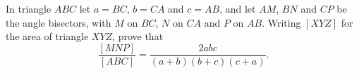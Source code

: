 In triangle $ABC$ let $a=BC$, $b=CA$ and $c=AB$, and let $AM$, $BN$ and $CP$ be the angle bisectors, with $M$ on $BC$, $N$ on $CA$ and $P$ on $AB$. Writing $[XYZ]$ for the area of triangle $XYZ$, prove that
\[\dfrac{[MNP]}{[ABC]}=\dfrac{2abc}{(a+b)(b+c)(c+a)} .\]
